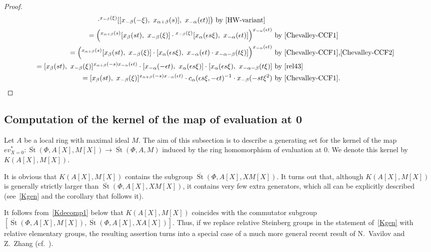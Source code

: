 \documentclass[oneside, 8pt]{amsart}
\theoremstyle{remark}
\theoremstyle{definition}
\numberwithin{lemma}{section}
\numberwithin{prop}{section}
\numberwithin{corollary}{section}
\numberwithin{externaltheorem}{section}
\DeclareMathOperator{\St}{St}
\numberwithin{equation}{section}
\begin{document}
\begin{proof}
\begin{align*}
\begin{split}
        \cdot {}^{x_{-\beta}(\xi)}[[ x_{-\beta}(-\xi),\ x_{\alpha+\beta}(s)],\ x_{-\alpha}(\epsilon t)]\bigr) &\ \text{by~\eqref{HW-variant}}
\end{split}\\
= \left({}^{x_{\alpha+\beta}(s)}[x_{\beta}(st),\ x_{-\beta}(\xi)] \cdot {}^{x_{-\beta}(\xi)}[x_{\alpha}(\epsilon s\xi),\ x_{-\alpha}(\epsilon t)]\right)^{x_{-\alpha}(\epsilon t)} &\ \text{by~\eqref{Chevalley-CCF1}}\\
= \left({}^ {x_{\alpha+\beta}(s)}[x_{\beta}(st),\ x_{-\beta}(\xi)] \cdot [x_{\alpha}(\epsilon s\xi),\ x_{-\alpha}(\epsilon t) \cdot x_{-\alpha-\beta}(t\xi)]\right)^{x_{-\alpha}(\epsilon t)} &\ \text{by~\eqref{Chevalley-CCF1},\eqref{Chevalley-CCF2}}\\
= [x_{\beta}(st),\ x_{-\beta}(\xi)] ^ {x_{\alpha+\beta}(-s) x_{-\alpha}(\epsilon t)} \cdot [x_{-\alpha}(-\epsilon t),\ x_{\alpha}(\epsilon s\xi)] \cdot [x_{\alpha}(\epsilon s\xi),\ x_{-\alpha-\beta}(t\xi)] &\ \text{by~\eqref{rel43}}\\
= [x_{\beta}(st),\ x_{-\beta}(\xi)] ^ {x_{\alpha+\beta}(-s) x_{-\alpha}(\epsilon t)} \cdot c_{\alpha}(\epsilon s\xi, -\epsilon t)^{-1} \cdot x_{-\beta}(-st\xi^2)  &\ \text{by~\eqref{Chevalley-CCF1}}. \qedhere \end{align*}
\end{proof}

\subsection{Computation of the kernel of the map of evaluation at 0}\label{sec:computationOfK}
Let $A$ be a local ring with maximal ideal $M$.
The aim of this subsection is to describe a generating set for the kernel of the map $ev_{X=0}^*\colon\overline{\St}(\Phi, A[X], M[X]) \to \overline{\St}(\Phi, A, M)$
induced by the ring homomorphism of evaluation at $0$. We denote this kernel by $K(A[X], M[X])$.

It is obvious that $K(A[X], M[X])$ contains the subgroup $\overline{\St}(\Phi, A[X], XM[X])$.
It turns out that, although $K(A[X], M[X])$ is generally strictly larger than $\overline{\St}(\Phi, A[X], XM[X])$,
 it contains very few extra generators, which all can be explicitly described (see~\cref{Kgen} and the corollary that follows it). 

It follows from~\cref{Kdecomp1} below that $K(A[X], M[X])$ coincides with the commutator subgroup $[\overline{\St}(\Phi, A[X], M[X]), \overline{\St}(\Phi, A[X], XA[X])].$ Thus, if we replace relative Steinberg groups in the statement of~\cref{Kgen} with relative elementary groups, the resulting assertion turns into a special case of a much more general recent result of N.~Vavilov and Z.~Zhang (cf.~\cite[Theorem~1]{VZ18}).
\end{document}

